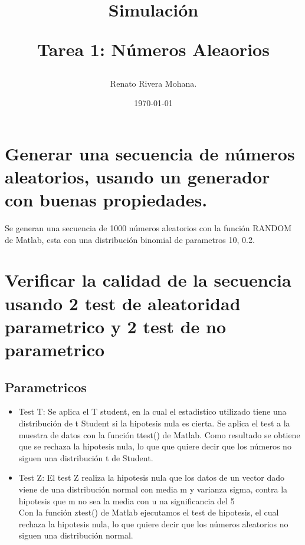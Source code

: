 \documentclass[letter, 10pt]{article}
\begin{document}
\title{Simulaci\'on \\ \begin{Large}Tarea 1: N\'umeros Aleaorios\end{Large}}
\author{Renato Rivera Mohana.}
\date{\today}
\maketitle

\section{Generar una secuencia de n\'umeros aleatorios, usando un generador con buenas propiedades.}
Se generan una secuencia de 1000 n\'umeros aleatorios con la funci\'on RANDOM de Matlab, esta con una distribuci\'on binomial de parametros 10, 0.2. 
\section{Verificar la calidad de la secuencia usando 2 test de aleatoridad parametrico y 2 test de no parametrico}
\subsection{Parametricos}
\begin{itemize}
\item Test T:
Se aplica el T student, en la cual el estadistico utilizado tiene una distribuci\'on de t Student si la hipotesis nula es cierta.
Se aplica el test a la muestra de datos con la funci\'on ttest() de Matlab. Como resultado se obtiene que se rechaza la hipotesis nula, lo que que quiere decir que los n\'umeros no siguen una distribuci\'on t de Student.
\item Test Z:
El test Z realiza la hipotesis nula que los datos de un vector dado viene de una distribuci\'on normal con media m y varianza sigma, contra la hipotesis que m no sea la media con u na significancia del 5%
\\
Con la funci\'on ztest() de Matlab ejecutamos el test de hipotesis,  el cual rechaza la hipotesis nula, lo que quiere decir que los n\'umeros aleatorios no siguen una distribuci\'on normal. 
\end{itemize}
\end{document}

